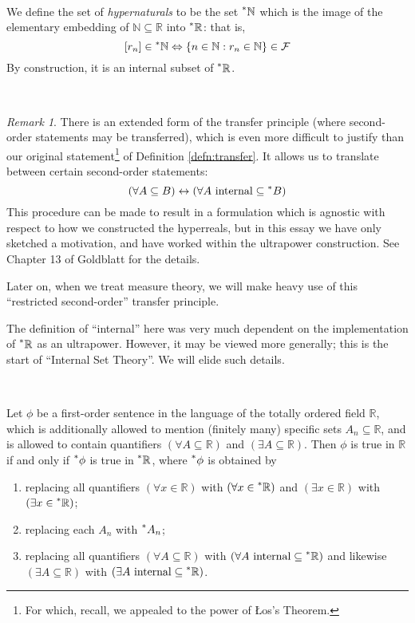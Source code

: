 \documentclass[11pt]{amsart}
\theoremstyle{remark}
\newtheorem*{remark}{Remark}
\newcommand{\hyp}[1][\mathbb{R}]{\prescript{*}{}{#1}}
\begin{document}
\

\begin{defn}
We define the set of \emph{hypernaturals} to be the set $\hyp[\mathbb{N}]$ which is the image of the elementary embedding of $\mathbb{N} \subseteq \mathbb{R}$ into $\hyp$: that is, $$[r_n] \in \hyp[\mathbb{N}] \Leftrightarrow \{ n \in \mathbb{N}: r_n \in \mathbb{N} \} \in \mathcal{F}$$
By construction, it is an internal subset of $\hyp$.
\end{defn}

\

\begin{remark}There is an extended form of the transfer principle (where second-order statements may be transferred), which is even more difficult to justify than our original statement\footnote{For which, recall, we appealed to the power of \L os's Theorem.} of Definition \ref{defn:transfer}.
It allows us to translate between certain second-order statements: $$(\forall A \subseteq B) \leftrightarrow (\forall \text{$A$ internal} \subseteq \hyp[B])$$ 
This procedure can be made to result in a formulation which is agnostic with respect to how we constructed the hyperreals, but in this essay we have only sketched a motivation, and have worked within the ultrapower construction.
See Chapter 13 of Goldblatt \cite{goldblatt} for the details.

Later on, when we treat measure theory, we will make heavy use of this ``restricted second-order'' transfer principle.

The definition of ``internal'' here was very much dependent on the implementation of $\hyp$ as an ultrapower.
However, it may be viewed more generally; this is the start of ``Internal Set Theory''. We will elide such details.
\end{remark}

\

\begin{defn} \label{defn:secondordertransfer}
Let $\phi$ be a first-order sentence in the language of the totally ordered field $\mathbb{R}$, which is additionally allowed to mention (finitely many) specific sets $A_n \subseteq \mathbb{R}$, and is allowed to contain quantifiers $(\forall A \subseteq \mathbb{R})$ and $(\exists A \subseteq \mathbb{R})$.
Then $\phi$ is true in $\mathbb{R}$ if and only if $\hyp[\phi]$ is true in $\hyp$, where $\hyp[\phi]$ is obtained by \begin{enumerate}
\item replacing all quantifiers $(\forall x \in \mathbb{R})$ with $(\forall x \in \hyp)$ and $(\exists x \in \mathbb{R})$ with $(\exists x \in \hyp)$;
\item replacing each $A_n$ with $\hyp[A_n]$;
\item replacing all quantifiers $(\forall A \subseteq \mathbb{R})$ with $(\forall \text{$A$ internal} \subseteq \hyp)$ and likewise $(\exists A \subseteq \mathbb{R})$ with $(\exists \text{$A$ internal} \subseteq \hyp)$.
\end{enumerate}
\end{defn}
\end{document}
